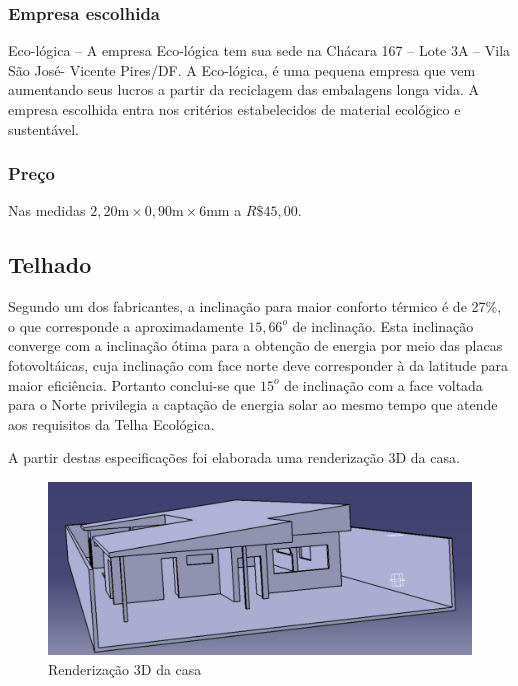 \subsubsection*{\textbf{Empresa escolhida}}
	Eco-lógica – A empresa Eco-lógica tem sua sede na Chácara 167 – Lote 3A – Vila São José- Vicente Pires/DF. A Eco-lógica, é uma pequena empresa que vem aumentando seus lucros a partir da reciclagem das embalagens longa vida. A empresa escolhida entra nos critérios estabelecidos de material ecológico e sustentável.

\subsubsection*{\textbf{Preço}}

	Nas medidas $2,20\si{\meter} \times 0,90\si{\meter} \times 6\si{\meter\meter}$ a $R\$ 45,00 $.\cite{ecologica}


\subsection{Telhado}

Segundo um dos fabricantes\cite{2013Onduline}, a inclinação para maior conforto térmico é de 27\%, o que corresponde a aproximadamente $15,66^o$ de inclinação. Esta inclinação converge com a inclinação ótima para a obtenção de energia por meio das placas fotovoltáicas, cuja inclinação com face norte deve corresponder à da latitude para maior eficiência\cite{2013Portal}. Portanto conclui-se que $15^o$ de inclinação com a face voltada para o Norte privilegia a captação de energia solar ao mesmo tempo que atende aos requisitos da Telha Ecológica.

A partir destas especificações foi elaborada uma renderização 3D da casa.
\newpage

\begin{figure}[H]
  \begin{center}
	\includegraphics[keepaspectratio,scale=0.5,angle=0]{figuras/3d.eps}
	\caption{Renderização 3D da casa}
  \end{center}
\end{figure}

